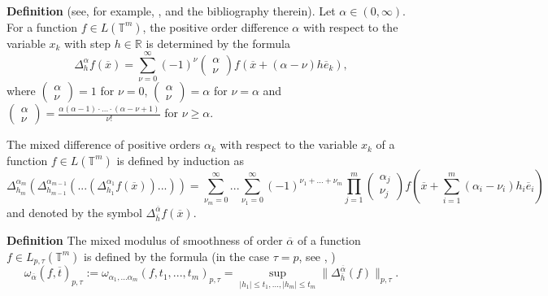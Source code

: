 \documentclass[12pt]{article}
\def\leq {\leqslant}
\theoremstyle{plain}
\begin{document}
{\bf Definition} (see, for example, \cite{10}, \cite{17} and the bibliography therein).
Let $\alpha\in (0, \infty)$. For a function $f \in L(\mathbb{T}^{m})$, the positive order difference $\alpha$ with respect to the variable $x_{k}$ with step $h \in \mathbb{R}$ is determined by the formula
\begin{equation*}
\Delta_{h}^{\alpha}f(\overline{x})=\sum_{\nu=0}^{\infty}(-1)^{\nu}
\left(\begin{smallmatrix}\alpha \\ \nu \end{smallmatrix}\right) f(\overline{x}+(\alpha - \nu)h\overline{e}_{k}),
\end{equation*}
where $\left(\begin{smallmatrix}\alpha \\ \nu \end{smallmatrix}\right)=1$ for $\nu=0$, $\left(\begin{smallmatrix}\alpha \\ \nu \end{smallmatrix}\right)=\alpha$ for $\nu=\alpha$ and $\left(\begin{smallmatrix}\alpha \\ \nu \end{smallmatrix}\right)=\frac{\alpha(\alpha -1)\cdot \ldots \cdot (\alpha-\nu+1)}{\nu !}$ for $\nu\geqslant\alpha$.

The mixed difference of positive orders $\alpha_{k}$ with respect to the variable $x_{k}$ of a function $f \in L(\mathbb{T}^{m})$ is defined by induction as
\begin{equation*}
\Delta_{h_{m}}^{\alpha_{m}}(\Delta_{h_{m-1}}^{\alpha_{m-1}}(...(\Delta_{h_{1}}^{\alpha_{1}}f(\overline{x}))...))=\sum_{\nu_{m}=0}^{\infty}...\sum_{\nu_{1}=0}^{\infty}(-1)^{\nu_{1}+...+\nu_{m}}\prod_{j=1}^{m}
\left(\begin{smallmatrix}\alpha_{j} \\ \nu_{j} \end{smallmatrix}\right) f(\overline{x}+\sum_{i=1}^{m}(\alpha_{i} - \nu_{i})h_{i}\overline{e}_{i})
\end{equation*}
and denoted by the symbol $\Delta_{\overline{h}}^{\overline\alpha}f(\overline{x})$.

{\bf Definition} The mixed modulus of smoothness of order $\overline\alpha$ of a function $f\in L_{p, \tau}(\mathbb{T}^{m})$ is defined by the formula (in the case $\tau=p$, see \cite{10}, \cite[Ch. 1, Se. 11]{6})
\begin{equation*}
\omega_{\overline\alpha}(f, \overline{t})_{p, \tau}:=\omega_{\alpha_{1},...\alpha_{m}}(f, t_{1},..., t_{m})_{p, \tau}=\sup_{|h_{1}|\leq t_{1},...,|h_{m}|\leq t_{m}}\|\Delta_{\overline h}^{\overline\alpha} (f)\|_{p, \tau}.
\end{equation*}
\end{document}
